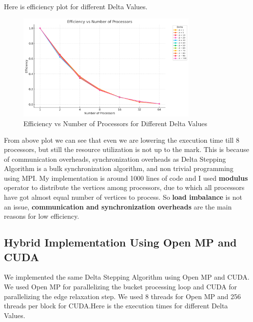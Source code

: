 \documentclass{article}
\begin{document}
\newpage 

Here is efficiency plot for different Delta Values.
\begin{figure}[h]
    \centering
    \includegraphics[width=0.8\textwidth]{efficiency.png}
    \caption{Efficiency vs Number of Processors for Different Delta Values}
    \label{fig:efficiency}
\end{figure}

From above plot we can see that even we are lowering the execution time till 8 processors, but still the resource utilization is not up to the mark. This is because of communication overheads, synchronization overheads as Delta Stepping Algorithm is a bulk synchronization algorithm, and non trivial programming using MPI. My implementation is around 1000 lines of code and I used \textbf{modulus} operator to distribute the vertices among processors, due to which all processors have got almost equal number of vertices to process. So \textbf{load imbalance} is not an issue, \textbf{communication and synchronization overheads} are the main reasons for low efficiency.

\subsection*{Hybrid Implementation Using Open MP and CUDA}
We implemented the same Delta Stepping Algorithm using Open MP and CUDA. We used Open MP for parallelizing the bucket processing loop and CUDA for parallelizing the edge relaxation step. We used 8 threads for Open MP and 256 threads per block for CUDA.Here is the execution times for different Delta Values.
\end{document}
